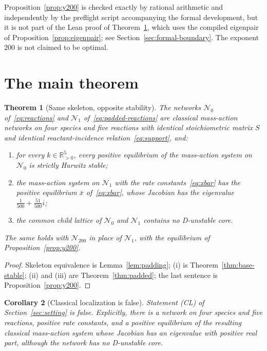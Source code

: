 \documentclass[11pt,a4paper]{article}
\theoremstyle{plain}
\newtheorem{theorem}{Theorem}[section]
\newtheorem{corollary}[theorem]{Corollary}
\theoremstyle{definition}
\theoremstyle{remark}
\newcommand{\R}{\mathbb{R}}
\newcommand{\xbar}{\bar{x}}
\begin{document}
Proposition~\ref{prop:y200} is checked exactly by rational arithmetic and independently by the preflight script accompanying the formal development, but it is not part of the Lean proof of Theorem~\ref{thm:main}, which uses the compiled eigenpair of Proposition~\ref{prop:eigenpair}; see Section~\ref{sec:formal-boundary}. The exponent $200$ is not claimed to be optimal.

\section{The main theorem}\label{sec:main}

\begin{theorem}[Same skeleton, opposite stability]\label{thm:main}
The networks $\mathcal N_0$ of~\eqref{eq:reactions} and $\mathcal N_1$ of~\eqref{eq:padded-reactions} are classical mass-action networks on four species and five reactions with identical stoichiometric matrix $S$ and identical reactant-incidence relation~\eqref{eq:support}, and:
\begin{enumerate}[label=(\roman*)]
\item for every $k\in\R^5_{>0}$, every positive equilibrium of the mass-action system on $\mathcal N_0$ is strictly Hurwitz stable;
\item the mass-action system on $\mathcal N_1$ with the rate constants~\eqref{eq:xbar} has the positive equilibrium $\xbar$ of~\eqref{eq:xbar}, whose Jacobian has the eigenvalue $\frac1{500}+\frac{51}{500}i$;
\item the common child lattice of $\mathcal N_0$ and $\mathcal N_1$ contains no D-unstable core.
\end{enumerate}
The same holds with $\mathcal N_{200}$ in place of $\mathcal N_1$, with the equilibrium of Proposition~\ref{prop:y200}.
\end{theorem}

\begin{proof}
Skeleton equivalence is Lemma~\ref{lem:padding}; (i) is Theorem~\ref{thm:base-stable}; (ii) and (iii) are Theorem~\ref{thm:padded}; the last sentence is Proposition~\ref{prop:y200}.
\end{proof}

\begin{corollary}[Classical localization is false]\label{cor:refutation}
Statement (CL) of Section~\ref{sec:setting} is false. Explicitly, there is a network on four species and five reactions, positive rate constants, and a positive equilibrium of the resulting classical mass-action system whose Jacobian has an eigenvalue with positive real part, although the network has no D-unstable core.
\end{corollary}
\end{document}

